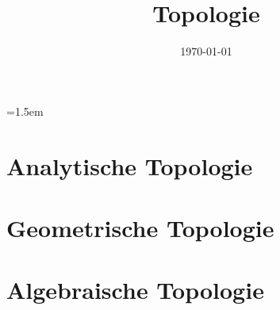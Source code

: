 \documentclass{mycourse}
\title{Topologie}
\date{\today}
\begin{document}
\emergencystretch=1.5em

\maketitle

\tableofcontents


\part{Analytische Topologie}





\part{Geometrische Topologie}



\part{Algebraische Topologie}


\end{document}
